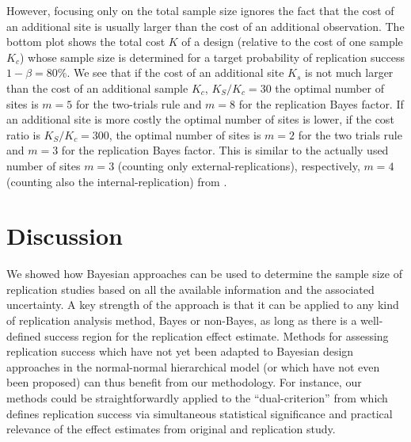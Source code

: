 However, focusing only on the total sample size ignores the fact that the cost
of an additional site is usually larger than the cost of an additional
observation. The bottom plot shows the total cost $K$ of a design (relative to
the cost of one sample $K_{c}$) whose sample size is determined for a target
probability of replication success $1 - \beta = 80$\%.
We see that if the cost of an additional site $K_{s}$ is not much larger than
the cost of an additional sample $K_{c}$, \eg{} $K_{S}/K_{c} = 30$ %
the optimal number of sites is $m = 5$ for the two-trials rule and $m = 8$ for
the replication Bayes factor. If an additional site is more costly the optimal
number of sites is lower, \eg{} if the cost ratio is $K_{S}/K_{c} = 300$,
the optimal number of sites is $m = 2$ for the two trials rule and $m = 3$ for
the replication Bayes factor. This is similar to the actually used number of
sites $m = 3$ (counting only external-replications), respectively, $m = 4$
(counting also the internal-replication) from \citet{Protzko2020}.

\section{Discussion}
\label{sec3:discussion}

We showed how Bayesian approaches can be used to determine the sample size of
replication studies based on all the available information and the associated
uncertainty. %
A key strength of the approach is that it can be applied to any kind of
replication analysis method, Bayes or non-Bayes, as long as there is a
well-defined success region for the replication effect estimate. Methods for
assessing replication success which have not yet been adapted to Bayesian design
approaches in the normal-normal hierarchical model (or which have not even been
proposed) can thus benefit from our methodology. For instance, our methods could
be straightforwardly applied to the ``dual-criterion'' from
\citet{Rosenkranz2021} which defines replication success via simultaneous
statistical significance and practical relevance of the effect estimates from
original and replication study.

